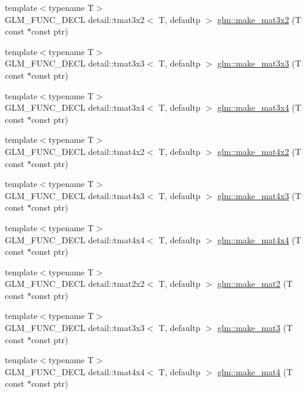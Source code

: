 \begin{CompactItemize}
\item 
{\footnotesize template$<$typename T$>$ }\\GLM\_\-FUNC\_\-DECL detail::tmat3x2$<$ T, defaultp $>$ \hyperlink{group__gtc__type__ptr_g6c7d94e71f8df512fca44427311baeae}{glm::make\_\-mat3x2} (T const $\ast$const ptr)
\item 
{\footnotesize template$<$typename T$>$ }\\GLM\_\-FUNC\_\-DECL detail::tmat3x3$<$ T, defaultp $>$ \hyperlink{group__gtc__type__ptr_g206b172296286d333b0ff92e77b28b66}{glm::make\_\-mat3x3} (T const $\ast$const ptr)
\item 
{\footnotesize template$<$typename T$>$ }\\GLM\_\-FUNC\_\-DECL detail::tmat3x4$<$ T, defaultp $>$ \hyperlink{group__gtc__type__ptr_g81d4d38acbaded29fb07ca282f089122}{glm::make\_\-mat3x4} (T const $\ast$const ptr)
\item 
{\footnotesize template$<$typename T$>$ }\\GLM\_\-FUNC\_\-DECL detail::tmat4x2$<$ T, defaultp $>$ \hyperlink{group__gtc__type__ptr_gc253e8157af1e4ec366c80d4bd90cbb2}{glm::make\_\-mat4x2} (T const $\ast$const ptr)
\item 
{\footnotesize template$<$typename T$>$ }\\GLM\_\-FUNC\_\-DECL detail::tmat4x3$<$ T, defaultp $>$ \hyperlink{group__gtc__type__ptr_gc375314134d9b3736395a4eda2602590}{glm::make\_\-mat4x3} (T const $\ast$const ptr)
\item 
{\footnotesize template$<$typename T$>$ }\\GLM\_\-FUNC\_\-DECL detail::tmat4x4$<$ T, defaultp $>$ \hyperlink{group__gtc__type__ptr_g74e671ae9dc7e5e8f21aa44ea263d76e}{glm::make\_\-mat4x4} (T const $\ast$const ptr)
\item 
{\footnotesize template$<$typename T$>$ }\\GLM\_\-FUNC\_\-DECL detail::tmat2x2$<$ T, defaultp $>$ \hyperlink{group__gtc__type__ptr_g08f35700be4d2e627da4d894edfa1b60}{glm::make\_\-mat2} (T const $\ast$const ptr)
\item 
{\footnotesize template$<$typename T$>$ }\\GLM\_\-FUNC\_\-DECL detail::tmat3x3$<$ T, defaultp $>$ \hyperlink{group__gtc__type__ptr_g63c04b2cd2367a06e9817a66b5025662}{glm::make\_\-mat3} (T const $\ast$const ptr)
\item 
{\footnotesize template$<$typename T$>$ }\\GLM\_\-FUNC\_\-DECL detail::tmat4x4$<$ T, defaultp $>$ \hyperlink{group__gtc__type__ptr_g082261bc3bf4a6d320d6beaebcbaf1db}{glm::make\_\-mat4} (T const $\ast$const ptr)

\end{CompactItemize}
